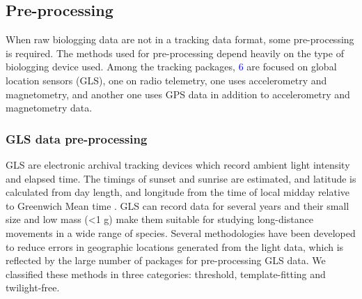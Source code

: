 \documentclass[a4paper,12pt]{article}
\begin{document}
\subsection*{Pre-processing} 

When raw biologging data are not in a tracking data format, some pre-processing is required. The methods used for pre-processing depend heavily on the type of biologging device used. Among the tracking packages, \textcolor{blue}{6} are focused on global location sensors (GLS), one on radio telemetry, one uses accelerometry and magnetometry, and another one uses GPS data in addition to accelerometry and magnetometry data. %
%

\subsubsection*{GLS data pre-processing} 

GLS are electronic archival tracking devices which record ambient light intensity and elapsed time. The timings of sunset and sunrise are estimated, and latitude is calculated from day length, and longitude from the time of local midday relative to Greenwich Mean time \citep{Afanasyev2004}. GLS can record data for several years and their small size and low mass (<1 g) make them suitable for studying long-distance movements in a wide range of species. Several methodologies have been developed to reduce errors in geographic locations generated from the light data, which is reflected by the large number of packages for pre-processing GLS data. We classified these methods in three categories: threshold, template-fitting and twilight-free.
\end{document}

